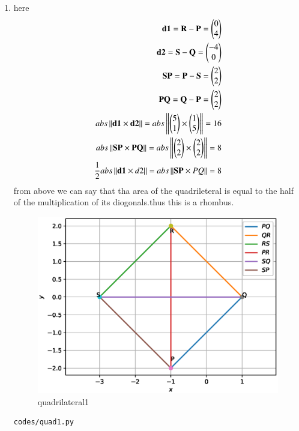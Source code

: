 \renewcommand{\theequation}{\theenumi}
\begin{enumerate}[label=\arabic*.,ref=\thesubsection.\theenumi]

\item here
\begin{align}
\mathbf{d1} = \mathbf{R} - \mathbf{P} = \begin{pmatrix}0\\4\end{pmatrix}
\\
\mathbf{d2} = \mathbf{S} - \mathbf{Q} = \begin{pmatrix}-4\\0\end{pmatrix}
\\
\mathbf {SP} = \mathbf P - \mathbf S =  \begin{pmatrix}2\\2\end{pmatrix}
\\
\mathbf {PQ} = \mathbf Q - \mathbf P = \begin{pmatrix}2\\2\end{pmatrix}
\\
abs\left\lVert \mathbf{\mathbf{d1}} \times \mathbf{\mathbf{d2}}\right\rVert = 
abs\left\lVert \mathbf{\begin{pmatrix}5\\1\end{pmatrix}} \times \mathbf{\begin{pmatrix}1\\5\end{pmatrix}}\right\rVert = 16
\\
abs\left\lVert \mathbf{\mathbf{SP}} \times \mathbf{\mathbf{PQ}}\right\rVert =  abs\left\lVert \mathbf{\begin{pmatrix}2\\2\end{pmatrix}} \times \mathbf{\begin{pmatrix}2\\2\end{pmatrix}}\right\rVert = 8
\\
\frac{1}{2}abs\left\lVert \mathbf{\mathbf{d1}} \times \mathbf{\mathbf} {d2}\right\rVert = abs\left\lVert \mathbf{\mathbf{SP}} \times \mathbf{\mathbf} {PQ}\right\rVert = 8
\end{align}
from above we can say that tha area of the quadrileteral is equal to the half of the multiplication of its diogonals.thus this is a rhombus.

\begin{figure}[!ht]
	\centering
	\includegraphics[width=\columnwidth]{./figures/quad1.eps}
	\caption{quadrilateral1 }
	\label{fig:quadrilateral1}
\end{figure}
\begin{lstlisting}
codes/quad1.py
\end{lstlisting}


\end{enumerate}
